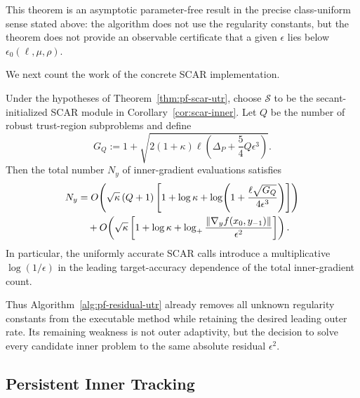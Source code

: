 This theorem is an asymptotic parameter-free result in the precise
class-uniform sense stated above: the algorithm does not use the
regularity constants, but the theorem does not provide an observable
certificate that a given $\epsilon$ lies below
$\epsilon_0(\ell,\mu,\rho)$.

We next count the work of the concrete SCAR implementation.

\begin{corollary}
\label{cor:pf-scar-inner-complexity}
Under the hypotheses of
Theorem~\ref{thm:pf-scar-utr}, choose
$\mathcal S$ to be the secant-initialized SCAR module in
Corollary~\ref{cor:scar-inner}.
Let $Q$ be the number of robust trust-region subproblems and define
\begin{equation}
    G_Q
    :=
    1+
    \sqrt{
        2(1+\kappa)\ell
        \left(
            \Delta_P+\frac54Q\epsilon^3
        \right)
    }.
    \label{eq:pf-gradient-level}
\end{equation}
Then the total number $N_y$ of inner-gradient evaluations satisfies
\begin{align}
    N_y
    &=
    O\!\left(
        \sqrt\kappa\,(Q+1)
        \left[
            1+\log\kappa
            +
            \log\!\left(
                1+
                \frac{
                    \ell\sqrt{G_Q}
                }{
                    4\epsilon^3
                }
            \right)
        \right]
    \right)
    \notag\\
    &\quad+
    O\!\left(
        \sqrt\kappa
        \left[
            1+\log\kappa
            +
            \log_+
            \frac{
                \|\nabla_yf(x_0,y_{-1})\|
            }{
                \epsilon^2
            }
        \right]
    \right).
    \label{eq:pf-inner-complexity}
\end{align}
In particular, the uniformly accurate SCAR calls introduce a
multiplicative $\log(1/\epsilon)$ in the leading target-accuracy
dependence of the total inner-gradient count.
\end{corollary}

Thus Algorithm~\ref{alg:pf-residual-utr} already removes all unknown
regularity constants from the executable method while retaining the
desired leading outer rate. Its remaining weakness is not outer
adaptivity, but the decision to solve every candidate inner problem
to the same absolute residual $\epsilon^2$.


\subsection{Persistent Inner Tracking}
\label{sec:persistent-inner-tracking}

